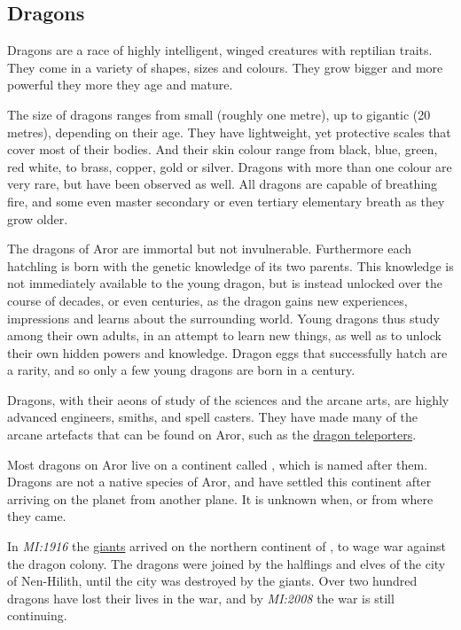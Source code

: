 \subsection{Dragons}
\label{sec:Dragons}

Dragons are a race of highly intelligent, winged creatures with reptilian
traits. They come in a variety of shapes, sizes and colours. They grow bigger
and more powerful they more they age and mature.

The size of dragons ranges from small (roughly one metre), up to gigantic (20
metres), depending on their age. They have lightweight, yet protective scales
that cover most of their bodies. And their skin colour range from black, blue,
green, red white, to brass, copper, gold or silver. Dragons with more than
one colour are very rare, but have been observed as well. All dragons are
capable of breathing fire, and some even master secondary or even tertiary
elementary breath as they grow older.

The dragons of Aror are immortal but not invulnerable. Furthermore each
hatchling is born with the genetic knowledge of its two parents. This knowledge
is not immediately available to the young dragon, but is instead unlocked
over the course of decades, or even centuries, as the dragon gains new
experiences, impressions and learns about the surrounding world. Young dragons
thus study among their own adults, in an attempt to learn new things, as well as
to unlock their own hidden powers and knowledge. Dragon eggs that successfully
hatch are a rarity, and so only a few young dragons are born in a century.

Dragons, with their aeons of study of the sciences and the arcane arts, are
highly advanced engineers, smiths, and spell casters. They have made many of
the arcane artefacts that can be found on Aror, such as the
\hyperref[sec:Dragon Teleporter]{dragon teleporters}.

Most dragons on Aror live on a continent called , which
is named after them. Dragons are not a native species of Aror, and have settled
this continent after arriving on the planet from another plane. It is unknown
when, or from where they came.

In \emph{MI:1916} the \hyperref[sec:Giants]{giants} arrived on the northern
continent of , to wage war against the dragon colony. The
dragons were joined by the halflings and elves of the city of Nen-Hilith,
until the city was destroyed by the giants. Over two hundred dragons have lost
their lives in the war, and by \emph{MI:2008} the war is still continuing.

